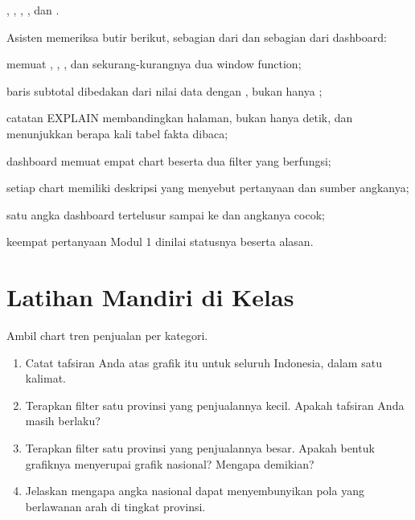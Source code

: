 \begin{luaran}
, ,
, , dan
.
\end{luaran}

\begin{checkpoint}
Asisten memeriksa butir berikut, sebagian dari 
dan sebagian dari dashboard:
\begin{ceklis}
  \item {} memuat , ,
        , dan sekurang-kurangnya dua window function;
  \item baris subtotal dibedakan dari nilai data dengan ,
        bukan hanya ;
  \item catatan EXPLAIN membandingkan halaman, bukan hanya detik, dan
        menunjukkan berapa kali tabel fakta dibaca;
  \item dashboard memuat empat chart beserta dua filter yang berfungsi;
  \item setiap chart memiliki deskripsi yang menyebut pertanyaan dan sumber
        angkanya;
  \item satu angka dashboard tertelusur sampai ke 
        dan angkanya cocok;
  \item keempat pertanyaan Modul 1 dinilai statusnya beserta alasan.
\end{ceklis}
\end{checkpoint}

\section{Latihan Mandiri di Kelas}


Ambil chart tren penjualan per kategori.

\begin{enumerate}[leftmargin=1.4em]
  \item Catat tafsiran Anda atas grafik itu untuk seluruh Indonesia, dalam satu
        kalimat.
  \item Terapkan filter satu provinsi yang penjualannya kecil. Apakah tafsiran
        Anda masih berlaku?
  \item Terapkan filter satu provinsi yang penjualannya besar. Apakah bentuk
        grafiknya menyerupai grafik nasional? Mengapa demikian?
  \item Jelaskan mengapa angka nasional dapat menyembunyikan pola yang
        berlawanan arah di tingkat provinsi.
\end{enumerate}

